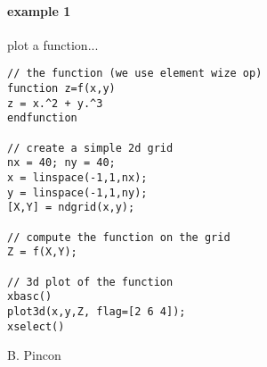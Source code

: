 
\begin{examples}
\paragraph{example 1} plot a function...
\begin{Verbatim}
// the function (we use element wize op)
function z=f(x,y)
z = x.^2 + y.^3
endfunction

// create a simple 2d grid
nx = 40; ny = 40;
x = linspace(-1,1,nx);
y = linspace(-1,1,ny);
[X,Y] = ndgrid(x,y);

// compute the function on the grid
Z = f(X,Y);

// 3d plot of the function
xbasc()
plot3d(x,y,Z, flag=[2 6 4]); 
xselect()
\end{Verbatim}

\end{examples}


\begin{authors}
B. Pincon
\end{authors}


